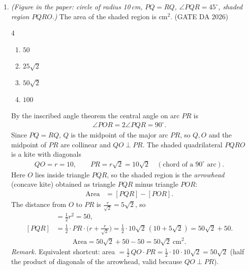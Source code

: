 \begin{enumerate}[label=\textbf{Q.\arabic*},leftmargin=*,start=1]
\item[\textbf{Q.10}] \textit{(Figure in the paper: circle of radius 10\,cm, $PQ=RQ$,
$\angle PQR=45^\circ$, shaded region $PQRO$.)} The area of the shaded region is
\underline{\hspace{1.5cm}} cm$^2$.
\hfill (GATE DA 2026)
\begin{multicols}{4}
\begin{enumerate}[label=(\alph*),itemsep=0pt]
 \item $50$ \item $25\sqrt2$ \item $50\sqrt2$ \item $100$
\end{enumerate}
\end{multicols}
\solution
By the inscribed angle theorem the central angle on arc $PR$ is
\begin{align}
\angle POR = 2\angle PQR = 90^\circ .
\end{align}
Since $PQ=RQ$, $Q$ is the midpoint of the major arc $PR$, so $Q,O$ and the midpoint
of $PR$ are collinear and $QO\perp PR$. The shaded quadrilateral $PQRO$ is a kite
with diagonals
\begin{align}
QO = r = 10,\qquad PR = r\sqrt2 = 10\sqrt2 \quad(\text{chord of a }90^\circ\text{ arc}).
\end{align}
Here $O$ lies inside triangle $PQR$, so the shaded region is the \emph{arrowhead}
(concave kite) obtained as triangle $PQR$ minus triangle $POR$:
\begin{align}
\text{Area}&=[PQR]-[POR].
\end{align}
The distance from $O$ to $PR$ is $\tfrac{r}{\sqrt2}=5\sqrt2$, so
\begin{align}
[POR]&=\tfrac12 r^2=50,\\
[PQR]&=\tfrac12\cdot PR\cdot\big(r+\tfrac{r}{\sqrt2}\big)
=\tfrac12\cdot 10\sqrt2\,(10+5\sqrt2)=50\sqrt2+50 .
\end{align}
\begin{align}
\text{Area}=50\sqrt2+50-50=\boxed{50\sqrt2\ \text{cm}^2}.
\end{align}
\textit{Remark.} Equivalent shortcut: area $=\tfrac12\,QO\cdot PR=\tfrac12\cdot10\cdot10\sqrt2=50\sqrt2$
(half the product of diagonals of the arrowhead, valid because $QO\perp PR$).


\end{enumerate}
